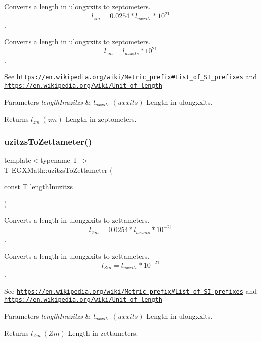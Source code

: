 Converts a length in ulongxxits to zeptometers. \[ l_{zm}=0.0254 * l_{uxxits} * 10^{21} \]. 

Converts a length in ulongxxits to zeptometers. \[ l_{zm}=l_{uxxits} * 10^{21} \].

See \href{https://en.wikipedia.org/wiki/Metric_prefix#List_of_SI_prefixes}{\tt https\+://en.\+wikipedia.\+org/wiki/\+Metric\+\_\+prefix\#\+List\+\_\+of\+\_\+\+S\+I\+\_\+prefixes} and \href{https://en.wikipedia.org/wiki/Unit_of_length}{\tt https\+://en.\+wikipedia.\+org/wiki/\+Unit\+\_\+of\+\_\+length} 
\begin{DoxyParams}{Parameters}
{\em length\+Inuzitzs} & $ l_{uxxits}\ (uxxits)$ Length in ulongxxits. \\
\hline
\end{DoxyParams}
\begin{DoxyReturn}{Returns}
$ l_{zm}\ (zm)$ Length in zeptometers. 
\end{DoxyReturn}
\mbox{\label{group___e_g_x_math-_conversions-_length_conversions-_imperial-uzitzs-_s_i_ga43f793911855da08c6649eb9b059d9c2}} 
\subsubsection{\texorpdfstring{uzitzs\+To\+Zettameter()}{uzitzsToZettameter()}}
{\footnotesize\ttfamily template$<$typename T $>$ \\
T E\+G\+X\+Math\+::uzitzs\+To\+Zettameter (\begin{DoxyParamCaption}\item[{const T}]{length\+Inuzitzs }\end{DoxyParamCaption})}



Converts a length in ulongxxits to zettameters. \[ l_{Zm}=0.0254 * l_{uxxits} * 10^{-21} \]. 

Converts a length in ulongxxits to zettameters. \[ l_{Zm}=l_{uxxits} * 10^{-21} \].

See \href{https://en.wikipedia.org/wiki/Metric_prefix#List_of_SI_prefixes}{\tt https\+://en.\+wikipedia.\+org/wiki/\+Metric\+\_\+prefix\#\+List\+\_\+of\+\_\+\+S\+I\+\_\+prefixes} and \href{https://en.wikipedia.org/wiki/Unit_of_length}{\tt https\+://en.\+wikipedia.\+org/wiki/\+Unit\+\_\+of\+\_\+length} 
\begin{DoxyParams}{Parameters}
{\em length\+Inuzitzs} & $ l_{uxxits}\ (uxxits)$ Length in ulongxxits. \\
\hline
\end{DoxyParams}
\begin{DoxyReturn}{Returns}
$ l_{Zm}\ (Zm)$ Length in zettameters. 
\end{DoxyReturn}
